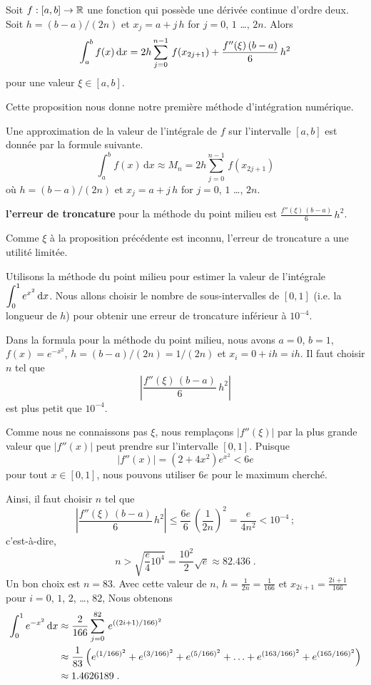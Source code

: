 {\begin{focus}{\prp}
Soit $f:[a,b]\rightarrow \mathbb{R}$ une fonction qui possède une dérivée
continue d'ordre deux.  Soit $h=(b-a)/(2n)$ et $x_j = a+j\,h$ for
$j=0$, $1$ \ldots, $2n$.  Alors
\[
\int_{a}^{b} f(x)\,\mathrm{d}x = 2h \sum_{j=0}^{n-1}\,f(x_{2j+1}) +
\frac{f''(\xi)\,(b-a)}{6}\,h^2
\]
pour une valeur $\xi \in [a,b]$.
\end{focus}

Cette proposition nous donne notre première méthode d'intégration
numérique.

\begin{focus}{\mth} 
Une approximation de la valeur de l'intégrale de $f$ sur l'intervalle
$[a,b]$ est donnée par la formule suivante.
\[
\int_{a}^{b} f(x)\,\text{d}x \approx M_n = 2h \sum_{j=0}^{n-1}\,f(x_{2j+1})
\]
où $h=(b-a)/(2n)$ et $x_j = a+j\,h$ for $j=0$, $1$ \ldots, $2n$.

{\bfseries l'erreur de troncature} pour la
méthode du point milieu est
$\displaystyle \frac{f''(\xi)\,(b-a)}{6}\,h^2$.
\label{CMR}
\end{focus}

Comme $\xi$ à la proposition précédente est inconnu, l'erreur de
troncature a une utilité limitée.

\begin{egg}
Utilisons la méthode du point milieu pour estimer la valeur de
l'intégrale $\displaystyle \int_0^1 e^{x^2}\,\mathrm{d}x$.  Nous allons
choisir le nombre de sous-intervalles de $[0,1]$ (i.e. la longueur de
$h$) pour obtenir une erreur de troncature inférieur à $10^{-4}$.

Dans la formula pour la méthode du point milieu, nous avons $a=0$, $b=1$,
$f(x) = e^{-x^2}$, $h= (b-a)/(2n) = 1/(2n)$ et $x_i = 0 +i h = ih$.
Il faut choisir $n$ tel que
\[
\left| \frac{f''(\xi)\,(b-a)}{6}\,h^2 \right|
\]
est plus petit que $10^{-4}$.

Comme nous ne connaissons pas $\xi$, nous remplaçons $|f''(\xi)|$ par
la plus grande valeur que $|f''(x)|$ peut prendre sur l'intervalle $[0,1]$.
Puisque
\[
|f''(x)| = (2+4x^2)e^{x^2} < 6e
\]
pour tout $x\in [0,1]$, nous pouvons utiliser $6e$ pour le maximum cherché.

Ainsi, il faut choisir $n$ tel que
\[
\left| \frac{f''(\xi)\,(b-a)}{6}\,h^2 \right|
\leq \frac{6e}{6}\, \left(\frac{1}{2n}\right)^2 
= \frac{e}{4n^2} < 10^{-4} \, ;
\]
c'est-à-dire,
\[
n > \sqrt{ \frac{e}{4} 10^4} = \frac{10^2}{2} \sqrt{e} \approx 82.436 \; .
\]
Un bon choix est $n=83$.  Avec cette valeur de $n$,
$\displaystyle h = \frac{1}{2n} = \frac{1}{166}$ et
$\displaystyle x_{2i+1} = \frac{2i+1}{166}$ pour $i=0$, $1$, $2$, \ldots, $82$,
Nous obtenons
\begin{align*}
\int_0^1 e^{-x^2}\,\mathrm{d}x & \approx \frac{2}{166} \sum_{j=0}^{82}\,
e^{((2i+1)/166)^2} \\
&\approx \frac{1}{83} \left( e^{(1/166)^2} + e^{(3/166)^2} +
e^{(5/166)^2} + \ldots + e^{(163/166)^2} + e^{(165/166)^2}\right) \\
&\approx 1.4626189 \; .
\end{align*}
\end{egg}

}
